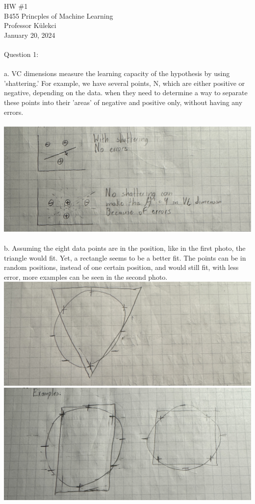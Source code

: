 \documentclass[12pt]{article}
\begin{document}
\vspace*{-2cm}
\noindent HW \#1 
\\ B455 Princples of Machine Learning 
\\ Professor Külekci
\\ January 20, 2024
\\\\Question 1:
\\\\\indent a. VC dimensions measure the learning capacity of the hypothesis by using 'shattering.'
For example, we have several points, N, which are either positive or negative, depending on the data.
when they need to determine a way to separate these points into their 'areas' of negative and positive only, without
having any errors. 
\\\\\includegraphics[scale=.54]{q1.jpg}
\\\\\indent b. Assuming the eight data points are in the position, like in the first photo,
the triangle would fit. Yet, a rectangle seems to be a better fit. The points can be in random positions, instead of 
one certain position, and would still fit, with less error, more examples can be seen in the second photo.\newline
\\\includegraphics[scale=.54]{q1b.jpg}
\\\includegraphics[scale=.54]{q1bII.jpg}
\end{document}
